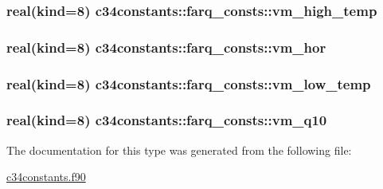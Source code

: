 \subsubsection[{vm\+\_\+high\+\_\+temp}]{\setlength{\rightskip}{0pt plus 5cm}real(kind=8) c34constants\+::farq\+\_\+consts\+::vm\+\_\+high\+\_\+temp}\label{structc34constants_1_1farq__consts_a0c4fb6c3e47624e7f62af6a74398c4ac}
\hypertarget{structc34constants_1_1farq__consts_a6124314ecc5a20b117ede014aebb6169}{}
\subsubsection[{vm\+\_\+hor}]{\setlength{\rightskip}{0pt plus 5cm}real(kind=8) c34constants\+::farq\+\_\+consts\+::vm\+\_\+hor}\label{structc34constants_1_1farq__consts_a6124314ecc5a20b117ede014aebb6169}
\hypertarget{structc34constants_1_1farq__consts_aa0c49273cd30fbedcbcb5a82328dff15}{}
\subsubsection[{vm\+\_\+low\+\_\+temp}]{\setlength{\rightskip}{0pt plus 5cm}real(kind=8) c34constants\+::farq\+\_\+consts\+::vm\+\_\+low\+\_\+temp}\label{structc34constants_1_1farq__consts_aa0c49273cd30fbedcbcb5a82328dff15}
\hypertarget{structc34constants_1_1farq__consts_a6f62b2ef08a8e18c71f2af508abeb173}{}
\subsubsection[{vm\+\_\+q10}]{\setlength{\rightskip}{0pt plus 5cm}real(kind=8) c34constants\+::farq\+\_\+consts\+::vm\+\_\+q10}\label{structc34constants_1_1farq__consts_a6f62b2ef08a8e18c71f2af508abeb173}


The documentation for this type was generated from the following file\+:\begin{DoxyCompactItemize}
\item 
\hyperlink{c34constants_8f90}{c34constants.\+f90}\end{DoxyCompactItemize}
